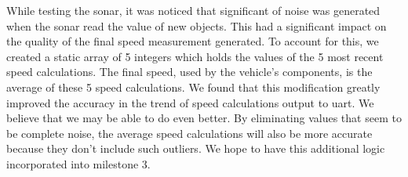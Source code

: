 While testing the sonar, it was noticed that significant of noise was generated when the sonar read the value of new objects. This had a significant impact on the quality of the final speed measurement generated. To account for this, we created a static array of 5 integers which holds the values of the 5 most recent speed calculations. The final speed, used by the vehicle's components, is the average of these 5 speed calculations. We found that this modification greatly improved the accuracy in the trend of speed calculations output to uart. We believe that we may be able to do even better. By eliminating values that seem to be complete noise, the average speed calculations will also be more accurate because they don't include such outliers. We hope to have this additional logic incorporated into milestone 3.

\lstset{language=c}
